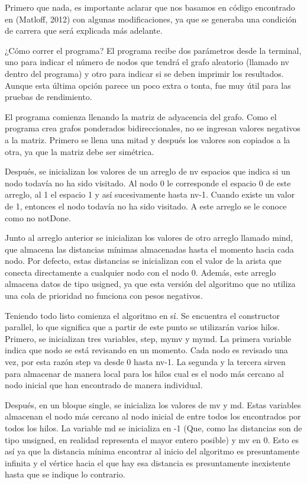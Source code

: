\documentclass[11pt]{article}
\begin{document}
Primero que nada, es importante aclarar que nos basamos en código encontrado en (Matloff, 2012) con algunas modificaciones, ya que se generaba una condición de carrera que será explicada más adelante.
\par 
¿Cómo correr el programa? El programa recibe dos parámetros desde la terminal, uno para indicar el número de nodos que tendrá el grafo aleatorio (llamado nv dentro del programa) y otro para indicar si se deben imprimir los resultados. Aunque esta última opción parece un poco extra o tonta, fue muy útil para las pruebas de rendimiento.
\par 
El programa comienza llenando la matriz de adyacencia del grafo. Como el programa crea grafos ponderados bidireccionales, no se ingresan valores negativos a la matriz. Primero se llena una mitad y después los valores son copiados a la otra, ya que la matriz debe ser simétrica.
\par 
Después, se inicializan los valores de un arreglo de nv espacios que indica si un nodo todavía no ha sido visitado. Al nodo 0 le corresponde el espacio 0 de este arreglo, al 1 el espacio 1 y así sucesivamente hasta nv-1. Cuando existe un valor de 1, entonces el nodo todavía no ha sido visitado. A este arreglo se le conoce como no notDone.
\par
Junto al arreglo anterior se inicializan los valores de otro arreglo llamado mind, que almacena las distancias mínimas almacenadas hasta el momento hacia cada nodo. Por defecto, estas distancias se inicializan con el valor de la arista que conecta directamente a cualquier nodo con el nodo 0. Además, este arreglo almacena datos de tipo usigned, ya que esta versión del algoritmo que no utiliza una cola de prioridad no funciona con pesos negativos. 
\par
Teniendo todo listo comienza el algoritmo en sí. Se encuentra el constructor parallel, lo que significa que a partir de este punto se utilizarán varios hilos. Primero, se inicializan tres variables, step, mymv y mymd. La primera variable indica que nodo se está revisando en un momento. Cada nodo es revisado una vez, por esta razón step va desde 0 hasta nv-1. La segunda y la tercera sirven para almacenar de manera local para los hilos cual es el nodo más cercano al nodo inicial que han encontrado de manera individual. 
\par
Después, en un bloque single, se inicializa los valores de mv y md. Estas variables almacenan el nodo más cercano al nodo inicial de entre todos los encontrados por todos los hilos. La variable md se inicializa en -1 (Que, como las distancias son de tipo unsigned, en realidad representa el mayor entero posible) y mv en 0. Esto es así ya que la distancia mínima encontrar al inicio del algoritmo es presuntamente infinita y el vértice hacia el que hay esa distancia es presuntamente inexistente hasta que se indique lo contrario.
\end{document}
